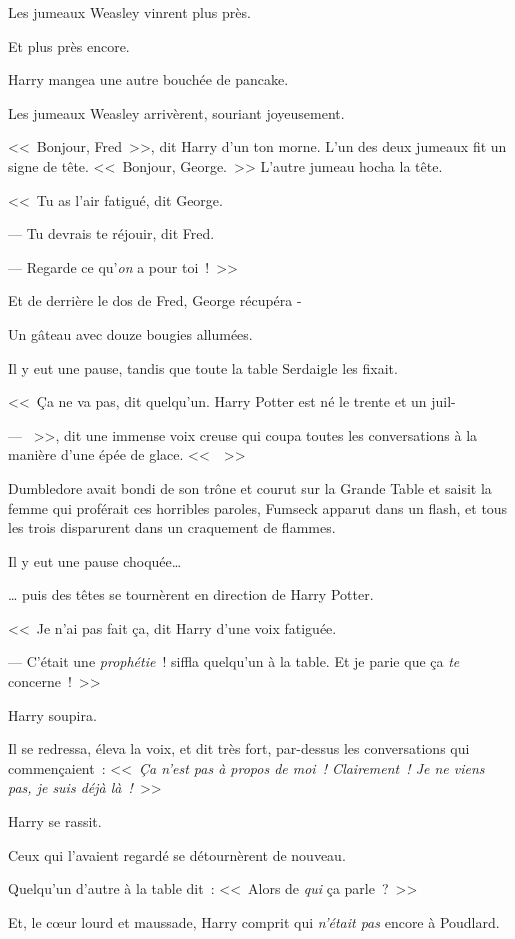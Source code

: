 Les jumeaux Weasley vinrent plus près.

Et plus près encore.

Harry mangea une autre bouchée de pancake.

Les jumeaux Weasley arrivèrent, souriant joyeusement.

<<~Bonjour, Fred~>>, dit Harry d'un ton morne. L'un des deux jumeaux fit un signe de tête. <<~Bonjour, George.~>> L'autre jumeau hocha la tête.

<<~Tu as l'air fatigué, dit George.

--- Tu devrais te réjouir, dit Fred.

--- Regarde ce qu'\emph{on} a pour toi~!~>>

Et de derrière le dos de Fred, George récupéra -

Un gâteau avec douze bougies allumées.

Il y eut une pause, tandis que toute la table Serdaigle les fixait.

<<~Ça ne va pas, dit quelqu'un. Harry Potter est né le trente et un juil-

--- ~>>, dit une immense voix creuse qui coupa toutes les conversations à la manière d'une épée de glace. <<~~>>

Dumbledore avait bondi de son trône et courut sur la Grande Table et saisit la femme qui proférait ces horribles paroles, Fumseck apparut dans un flash, et tous les trois disparurent dans un craquement de flammes.

Il y eut une pause choquée…

… puis des têtes se tournèrent en direction de Harry Potter.

<<~Je n'ai pas fait ça, dit Harry d'une voix fatiguée.

--- C'était une \emph{prophétie}~! siffla quelqu'un à la table. Et je parie que ça \emph{te} concerne~!~>>

Harry soupira.

Il se redressa, éleva la voix, et dit très fort, par-dessus les conversations qui commençaient~: <<~\emph{Ça n'est pas à propos de moi~! Clairement~! Je ne viens pas, je suis déjà là~!}~>>

Harry se rassit.

Ceux qui l'avaient regardé se détournèrent de nouveau.

Quelqu'un d'autre à la table dit~: <<~Alors de \emph{qui} ça parle~?~>>

Et, le cœur lourd et maussade, Harry comprit qui \emph{n'était pas} encore à Poudlard.


